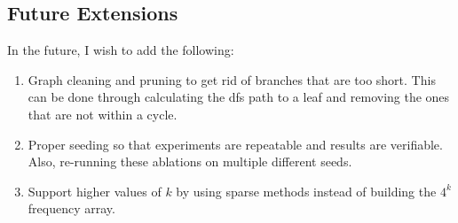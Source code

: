 \documentclass[10pt]{article}
\begin{document}
\newpage
\subsection*{Future Extensions}
In the future, I wish to add the following:
\begin{enumerate}
  \item Graph cleaning and pruning to get rid of branches that are too short. This can be done through calculating the dfs path to a leaf and removing the ones that are not within a cycle.
  \item Proper seeding so that experiments are repeatable and results are verifiable. Also, re-running these ablations on multiple different seeds.
  \item Support higher values of $k$ by using sparse methods instead of building the $4^k$ frequency array.
\end{enumerate}
\end{document}
